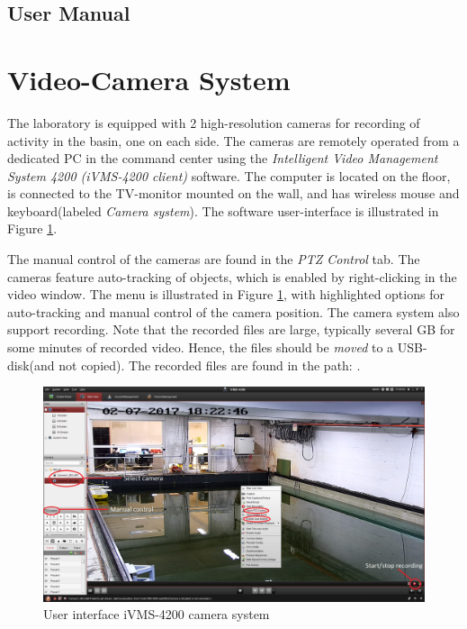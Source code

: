 \documentclass[a4paper,english]{report}
\begin{document}
\subsection{User Manual}
\clearpage{}
\section{Video-Camera System}
The laboratory is equipped with 2 high-resolution cameras for recording of activity in the basin, one on each side. The cameras are remotely operated from a dedicated PC in the command center using the \textit{Intelligent Video Management System 4200 (iVMS-4200 client)} software. The computer is located on the floor, is connected to the TV-monitor mounted on the wall, and has wireless mouse and keyboard(labeled \textit{Camera system}). The software user-interface is illustrated in Figure \ref{fig:userinterface_iVMS-4200}. 

The manual control of the cameras are found in the \textit{PTZ Control} tab. The cameras feature auto-tracking of objects, which is enabled by right-clicking in the video window. The menu is illustrated in Figure \ref{fig:userinterface_iVMS-4200}, with highlighted options for auto-tracking and manual control of the camera position. 
The camera system also support recording. Note that the recorded files are large, typically several GB for some minutes of recorded video. Hence, the files should be \textit{moved} to a USB-disk(and not copied). The recorded files are found in the path: .
\begin{figure}[htb!]
	\centerline{\includegraphics[width=1.4\linewidth]{fig/Camera_userinterface.png}}
	\caption{User interface iVMS-4200 camera system}
	\label{fig:userinterface_iVMS-4200}
\end{figure}

\clearpage


\end{document}
